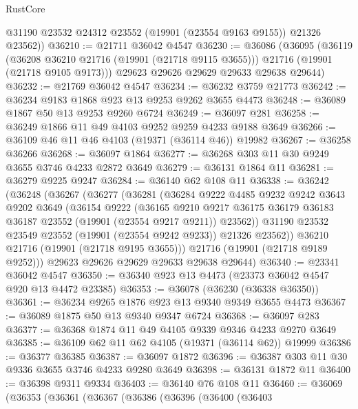 \begin{lexlean}{RustCore}
\begin{coremodule}
        @31190
        @23532
        @24312
        @23552
        (@19901 (@23554 @9163 @9155))
        @21326
        @23562))
@36210 := @21711 @36042 @4547
@36230 := @36086
    (@36095
      (@36119
        (@36208 @36210 @21716 (@19901 (@21718 @9115 @3655)))
        @21716
        (@19901 (@21718 @9105 @9173)))
      @29623
      @29626
      @29629
      @29633
      @29638
      @29644)
@36232 := @21769 @36042 @4547
@36234 := @36232 @3759 @21773
@36242 := @36234 @9183 @1868 @923 @13 @9253 @9262 @3655 @4473
@36248 := @36089 @1867 @50 @13 @9253 @9260 @6724
@36249 := @36097 @281
@36258 := @36249 @1866 @11 @49 @4103 @9252 @9259 @4233 @9188 @3649
@36266 := @36109 @46 @11 @46 @4103 (@19371 (@36114 @46)) @19982
@36267 := @36258 @36266
@36268 := @36097 @1864
@36277 := @36268 @303 @11 @30 @9249 @3655 @3746 @4233 @2872 @3649
@36279 := @36131 @1864 @11
@36281 := @36279 @9225 @9247
@36284 := @36140 @62 @108 @11
@36338 := @36242
    (@36248
      (@36267
        (@36277
          (@36281
            (@36284
              @9222
              @4485
              @9232
              @9242
              @3643
              @9202
              @3649
              (@36154
                @9222
                (@36165
                  @9210
                  @9217
                  @36175
                  @36179
                  @36183
                  @36187
                  @23552
                  (@19901 (@23554 @9217 @9211))
                  @23562))
              @31190
              @23532
              @23549
              @23552
              (@19901 (@23554 @9242 @9233))
              @21326
              @23562))
          @36210
          @21716
          (@19901 (@21718 @9195 @3655)))
        @21716
        (@19901 (@21718 @9189 @9252)))
      @29623
      @29626
      @29629
      @29633
      @29638
      @29644)
@36340 := @23341 @36042 @4547
@36350 := @36340 @923 @13 @4473 (@23373 @36042 @4547 @920 @13 @4472 @23385)
@36353 := @36078 (@36230 (@36338 @36350))
@36361 := @36234 @9265 @1876 @923 @13 @9340 @9349 @3655 @4473
@36367 := @36089 @1875 @50 @13 @9340 @9347 @6724
@36368 := @36097 @283
@36377 := @36368 @1874 @11 @49 @4105 @9339 @9346 @4233 @9270 @3649
@36385 := @36109 @62 @11 @62 @4105 (@19371 (@36114 @62)) @19999
@36386 := @36377 @36385
@36387 := @36097 @1872
@36396 := @36387 @303 @11 @30 @9336 @3655 @3746 @4233 @9280 @3649
@36398 := @36131 @1872 @11
@36400 := @36398 @9311 @9334
@36403 := @36140 @76 @108 @11
@36460 := @36069
    (@36353
      (@36361
        (@36367
          (@36386
            (@36396
              (@36400
                (@36403

\end{coremodule}
\end{lexlean}
